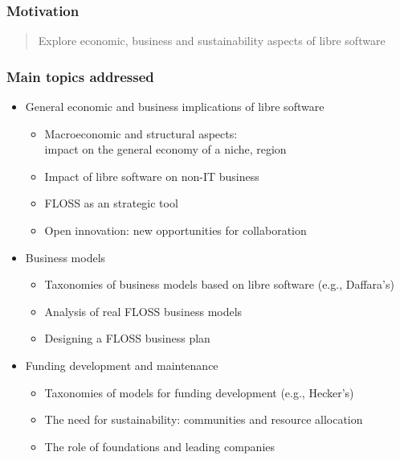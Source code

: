 
\begin{frame}
\frametitle{Motivation}

\begin{quote}
\begin{center}
{\LARGE Explore economic, business and sustainability aspects of libre software}
\end{center}
\end{quote}

\end{frame}


\begin{frame}
\frametitle{Main topics addressed}

\begin{itemize}
\item General economic and business implications of libre software
  \begin{itemize}
  \item Macroeconomic and structural aspects: \\
    impact on the general economy of a niche, region
  \item Impact of libre software on non-IT business
  \item FLOSS as an strategic tool
  \item Open innovation: new opportunities for collaboration
  \end{itemize}
\item Business models
  \begin{itemize}
  \item Taxonomies of business models based on libre software (e.g., Daffara's)
  \item Analysis of real FLOSS business models
  \item Designing a FLOSS business plan
  \end{itemize}
\item Funding development and maintenance
  \begin{itemize}
  \item Taxonomies of models for funding development (e.g., Hecker's)
  \item The need for sustainability: communities and resource allocation
  \item The role of foundations and leading companies
  \end{itemize}
\end{itemize}

\end{frame}

